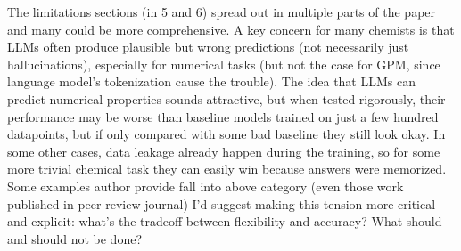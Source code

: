 \begin{reply}
\end{reply}

\begin{point}
The limitations sections (in 5 and 6) spread out in multiple parts of the paper and many could be more comprehensive. A key concern for many chemists is that LLMs often produce plausible but wrong predictions (not necessarily just hallucinations), especially for numerical tasks (but not the case for GPM, since language model's tokenization cause the trouble). The idea that LLMs can predict numerical properties sounds attractive, but when tested rigorously, their performance may be worse than baseline models trained on just a few hundred datapoints, but if only compared with some bad baseline they still look okay. In some other cases, data leakage already happen during the training, so for some more trivial chemical task they can easily win because answers were memorized. Some examples author provide fall into above category (even those work published in peer review journal) I'd suggest making this tension more critical and explicit: what's the tradeoff between flexibility and accuracy? What should and should not be done?
\end{point}

